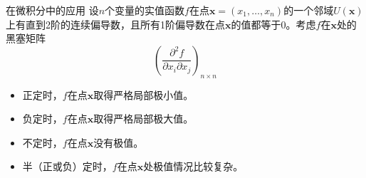 \documentclass[10pt]{beamer}
\makeatletter
\newcommand\HUGE{\@setfontsize\Huge{35}{46}}
\makeatother
\begin{document}

\begin{frame}

\begin{block}{在微积分中的应用}
设$n$个变量的实值函数$f$在点$\mathbf{x} = (x_1,\ldots,x_n)$的一个邻域$U(\mathbf{x})$上有直到2阶的连续偏导数，且所有1阶偏导数在点$\mathbf{x}$的值都等于0。考虑$f$在$\mathbf{x}$处的黑塞矩阵
$$\left( \dfrac{\partial^2 f}{\partial x_i \partial x_j} \right)_{n\times n}$$
\begin{itemize}
\item 正定时，$f$在点$\mathbf{x}$取得严格局部极小值。
\item 负定时，$f$在点$\mathbf{x}$取得严格局部极大值。
\item 不定时，$f$在点$\mathbf{x}$没有极值。
\pause
\item 半（正或负）定时，$f$在点$\mathbf{x}$处极值情况比较复杂。
\end{itemize}
\end{block}

\end{frame}










\end{document}
